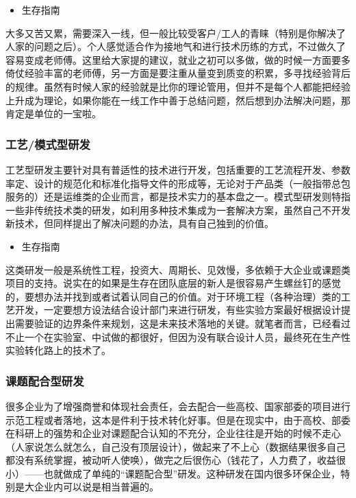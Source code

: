 \documentclass[]{book}
\providecommand{\tightlist}{%
  \setlength{\itemsep}{0pt}\setlength{\parskip}{0pt}}
\begin{document}
\begin{itemize}
\tightlist
\item
  生存指南
\end{itemize}

大多又苦又累，需要深入一线，但一般比较受客户/工人的青睐（特别是你解决了人家的问题之后）。个人感觉适合作为接地气和进行技术历练的方式，不过做久了容易变成老师傅。这里给大家提的建议，就业之初可以多做，做的时候一方面要多倚仗经验丰富的老师傅，另一方面是要注重从量变到质变的积累，多寻找经验背后的规律。虽然有时候人家的经验就是比你的理论管用，但并不是每个人都能把经验上升成为理论，如果你能在一线工作中善于总结问题，然后想到办法解决问题，那肯定是单位的一宝啦。

\subsubsection{工艺/模式型研发}

工艺型研发主要针对具有普适性的技术进行开发，包括重要的工艺流程开发、参数率定、设计的规范化和标准化指导文件的形成等，无论对于产品类（一般指带总包服务的）还是运维类的企业而言，都是技术实力的基本盘之一。模式型研发则特指一些非传统技术类的研发，如利用多种技术集成为一套解决方案，虽然自己不开发新技术，但同样提出了解决问题的办法，具有自己独到的价值。

\begin{itemize}
\tightlist
\item
  生存指南
\end{itemize}

这类研发一般是系统性工程，投资大、周期长、见效慢，多依赖于大企业或课题类项目的支持。说实在的如果是生存在团队底层的新人是很容易产生螺丝钉的感觉的，要想办法并找到或者试着认同自己的价值。对于环境工程（各种治理）类的工艺开发，一定要想方设法结合设计部门来进行研发，有些实验方案最好根据设计提出需要验证的边界条件来规划，这是未来技术落地的关键。就笔者而言，已经看过不止一个在实验室、中试做的都很好，但因为没有联合设计人员，最终死在生产性实验转化路上的技术了。

\subsubsection{课题配合型研发}

很多企业为了增强商誉和体现社会责任，会去配合一些高校、国家部委的项目进行示范工程或者落地，这本是件利于技术转化好事。但是在现实中，由于高校、部委在科研上的强势和企业对课题配合认知的不充分，企业往往是开始的时候不走心（人家说怎么就怎么，自己没有顶层设计），做起来了不上心（数据结果很多自己都没有系统掌握，被动听人使唤），做完之后很伤心（钱花了，人力费了，收益很小）------也就做成了单纯的``课题配合型''研发。这种研发在国内很多环保企业，特别是大企业内可以说是相当普遍的。
\end{document}

